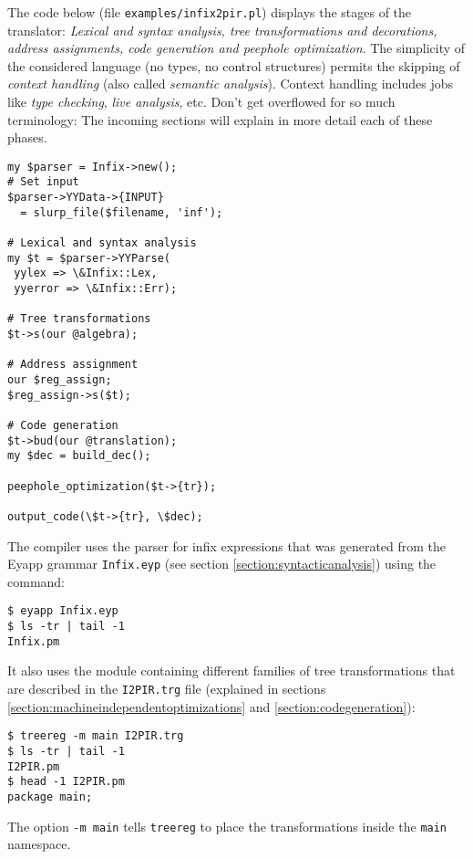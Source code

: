 The code below 
(file \verb|examples/infix2pir.pl|) %
displays
the stages of the translator: \emph{Lexical
and syntax analysis, tree transformations
and decorations,
address assignments, code generation
and peephole optimization}. The simplicity of the 
considered language (no types, no control structures) 
permits the skipping of 
\emph{context handling} (also called \emph{semantic analysis}).
Context handling includes jobs like \emph{type checking}, 
\emph{live analysis}, etc.
Don't get overflowed for so much terminology:
The incoming sections will
explain in more detail each of these phases.
\begin{verbatim}
my $parser = Infix->new();
# Set input 
$parser->YYData->{INPUT} 
  = slurp_file($filename, 'inf');

# Lexical and syntax analysis
my $t = $parser->YYParse(
 yylex => \&Infix::Lex, 
 yyerror => \&Infix::Err);

# Tree transformations
$t->s(our @algebra);

# Address assignment
our $reg_assign;
$reg_assign->s($t);

# Code generation
$t->bud(our @translation);
my $dec = build_dec();

peephole_optimization($t->{tr});

output_code(\$t->{tr}, \$dec);
\end{verbatim}

The compiler uses the parser for infix expressions
that was generated from the Eyapp grammar  \verb|Infix.eyp|
(see section \ref{section:syntacticanalysis})
using the command:
\begin{verbatim}
$ eyapp Infix.eyp
$ ls -tr | tail -1
Infix.pm
\end{verbatim}
It also uses the module containing different families of tree
transformations that are described in the \verb|I2PIR.trg| file 
(explained in 
sections \ref{section:machineindependentoptimizations} and \ref{section:codegeneration}): 
\begin{verbatim}
$ treereg -m main I2PIR.trg
$ ls -tr | tail -1
I2PIR.pm
$ head -1 I2PIR.pm
package main;
\end{verbatim}
The option \verb|-m main| tells \verb|treereg|
to place the transformations inside the \verb|main|
namespace. 
